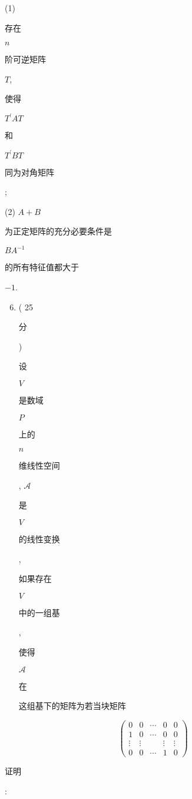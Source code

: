 \documentclass[10pt]{article}
\begin{document}
(1) \begin{CJK}{UTF8}{mj}存在\end{CJK} $n$ \begin{CJK}{UTF8}{mj}阶可逆矩阵\end{CJK} $T$, \begin{CJK}{UTF8}{mj}使得\end{CJK} $T^{\prime} A T$ \begin{CJK}{UTF8}{mj}和\end{CJK} $T^{\prime} B T$ \begin{CJK}{UTF8}{mj}同为对角矩阵\end{CJK};

(2) $A+B$ \begin{CJK}{UTF8}{mj}为正定矩阵的充分必要条件是\end{CJK} $B A^{-1}$ \begin{CJK}{UTF8}{mj}的所有特征值都大于\end{CJK} $-1$.

\begin{enumerate}
  \setcounter{enumi}{5}
  \item ( 25 \begin{CJK}{UTF8}{mj}分\end{CJK}) \begin{CJK}{UTF8}{mj}设\end{CJK} $V$ \begin{CJK}{UTF8}{mj}是数域\end{CJK} $P$ \begin{CJK}{UTF8}{mj}上的\end{CJK} $n$ \begin{CJK}{UTF8}{mj}维线性空间\end{CJK}, $\mathscr{A}$ \begin{CJK}{UTF8}{mj}是\end{CJK} $V$ \begin{CJK}{UTF8}{mj}的线性变换\end{CJK}, \begin{CJK}{UTF8}{mj}如果存在\end{CJK} $V$ \begin{CJK}{UTF8}{mj}中的一组基\end{CJK}, \begin{CJK}{UTF8}{mj}使得\end{CJK} $\mathscr{A}$ \begin{CJK}{UTF8}{mj}在\end{CJK} \begin{CJK}{UTF8}{mj}这组基下的矩阵为若当块矩阵\end{CJK}
\end{enumerate}
$$
\left(\begin{array}{ccccc}
0 & 0 & \cdots & 0 & 0 \\
1 & 0 & \cdots & 0 & 0 \\
\vdots & \vdots & & \vdots & \vdots \\
0 & 0 & \cdots & 1 & 0
\end{array}\right)
$$
\begin{CJK}{UTF8}{mj}证明\end{CJK}:
\end{document}
